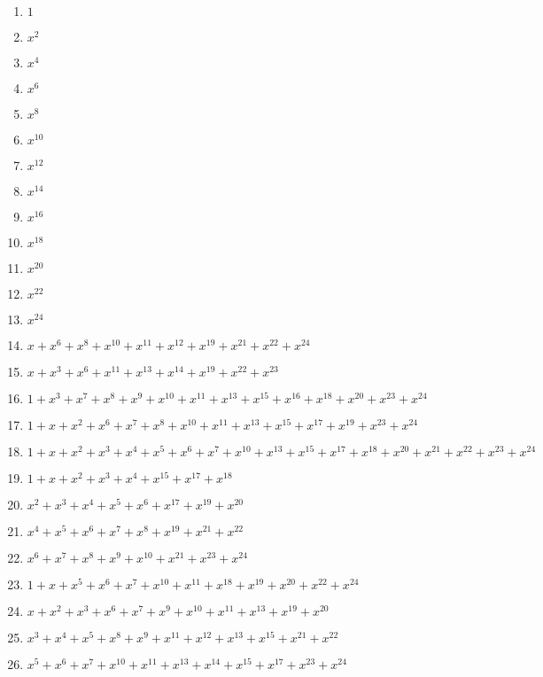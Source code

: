 \documentclass[fleqn]{article}
\begin{document}
    \begin{enumerate}
        \item ${1}$
        \item $x^{2}$
        \item $x^{4}$
        \item $x^{6}$
        \item $x^{8}$
        \item $x^{10}$
        \item $x^{12}$
        \item $x^{14}$
        \item $x^{16}$
        \item $x^{18}$
        \item $x^{20}$
        \item $x^{22}$
        \item $x^{24}$
        \item $x+x^6+x^8+x^{10}+x^{11}+x^{12}+x^{19}+x^{21}+x^{22}+x^{24}$
        \item $x+x^3+x^6+x^{11}+x^{13}+x^{14}+x^{19}+x^{22}+x^{23}$
        \item $1+x^3+x^7+x^8+x^9+x^{10}+x^{11}+x^{13}+x^{15}+x^{16}+x^{18}+x^{20}+x^{23}+x^{24}$
        \item $1+x+x^2+x^6+x^7+x^8+x^{10}+x^{11}+x^{13}+x^{15}+x^{17}+x^{19}+x^{23}+x^{24}$
        \item $1+x+x^2+x^3+x^4+x^5+x^6+x^7+x^{10}+x^{13}+x^{15}+x^{17}+x^{18}+x^{20}+x^{21}+x^{22}+x^{23}+x^{24}$
        \item $1+x+x^2+x^3+x^4+x^{15}+x^{17}+x^{18}$
        \item $x^2+x^3+x^4+x^5+x^6+x^{17}+x^{19}+x^{20}$
        \item $x^4+x^5+x^6+x^7+x^8+x^{19}+x^{21}+x^{22}$
        \item $x^6+x^7+x^8+x^9+x^{10}+x^{21}+x^{23}+x^{24}$
        \item $1+x+x^5+x^6+x^7+x^{10}+x^{11}+x^{18}+x^{19}+x^{20}+x^{22}+x^{24}$
        \item $x+x^2+x^3+x^6+x^7+x^9+x^{10}+x^{11}+x^{13}+x^{19}+x^{20}$
        \item $x^3+x^4+x^5+x^8+x^9+x^{11}+x^{12}+x^{13}+x^{15}+x^{21}+x^{22}$
        \item $x^5+x^6+x^7+x^{10}+x^{11}+x^{13}+x^{14}+x^{15}+x^{17}+x^{23}+x^{24}$
    \end{enumerate}
\end{document}
